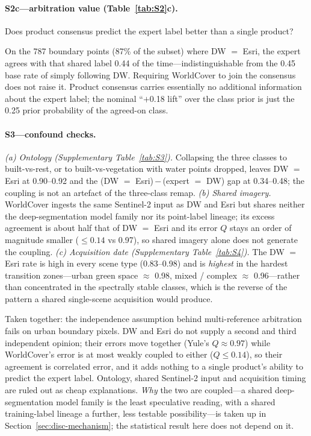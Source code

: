 \paragraph{S2c---arbitration value (Table~\ref{tab:S2}c).}
Does product consensus predict the expert label better than a single product?

On the 787 boundary points (87\% of the subset) where DW $=$ Esri, the expert
agrees with that shared label 0.44 of the time---indistinguishable from the 0.45
base rate of simply following DW. Requiring WorldCover to join the consensus
does not raise it. Product consensus carries essentially no additional
information about the expert label; the nominal ``$+$0.18 lift'' over the class
prior is just the 0.25 prior probability of the agreed-on class.

\paragraph{S3---confound checks.}
\emph{(a) Ontology (Supplementary Table~\ref{tab:S3}).} Collapsing the three
classes to built-vs-rest, or to built-vs-vegetation with water points dropped,
leaves DW $=$ Esri at 0.90--0.92 and the (DW $=$ Esri)\,$-$\,(expert $=$ DW) gap
at 0.34--0.48; the coupling is not an artefact of the three-class remap.
\emph{(b) Shared imagery.} WorldCover ingests the same Sentinel-2 input as DW
and Esri but shares neither the deep-segmentation model family nor its
point-label lineage; its excess agreement is about half that of DW $=$ Esri and
its error $Q$ stays an order of magnitude smaller ($\le 0.14$ vs 0.97), so
shared imagery alone does not generate the coupling.
\emph{(c) Acquisition date (Supplementary Table~\ref{tab:S4}).} The DW $=$ Esri
rate is high in every scene type (0.83--0.98) and is \emph{highest} in the
hardest transition zones---urban green space $\approx$ 0.98, mixed / complex
$\approx$ 0.96---rather than concentrated in the spectrally stable classes,
which is the reverse of the pattern a shared single-scene acquisition would
produce.

Taken together: the independence assumption behind multi-reference arbitration
fails on urban boundary pixels. DW and Esri do not supply a second and third
independent opinion; their errors move together (Yule's $Q \approx 0.97$) while
WorldCover's error is at most weakly coupled to either ($Q \le 0.14$), so their
agreement is correlated error, and it adds nothing to a single product's ability
to predict the expert label. Ontology, shared Sentinel-2 input and acquisition timing are
ruled out as cheap explanations. \emph{Why} the two are coupled---a shared
deep-segmentation model family is the least speculative reading, with a shared
training-label lineage a further, less testable possibility---is taken up in
Section~\ref{sec:disc-mechanism}; the statistical result here does not depend on
it.

